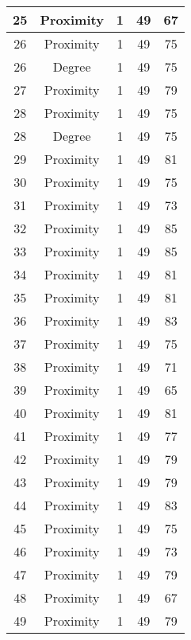 \documentclass[results.tex]{subfiles}
\begin{document}
\begin{center}
\begin{tabular}{| c || c | c | c | c |}
    \hline
    25 & Proximity & 1 & 49 & 67 \\ 
    \hline
    26 & Proximity & 1 & 49 & 75 \\ 
    \hline
    26 & Degree & 1 & 49 & 75 \\ 
    \hline
    27 & Proximity & 1 & 49 & 79 \\ 
    \hline
    28 & Proximity & 1 & 49 & 75 \\ 
    \hline
    28 & Degree & 1 & 49 & 75 \\ 
    \hline
    29 & Proximity & 1 & 49 & 81 \\ 
    \hline
    30 & Proximity & 1 & 49 & 75 \\ 
    \hline
    31 & Proximity & 1 & 49 & 73 \\ 
    \hline
    32 & Proximity & 1 & 49 & 85 \\ 
    \hline
    33 & Proximity & 1 & 49 & 85 \\ 
    \hline
    34 & Proximity & 1 & 49 & 81 \\ 
    \hline
    35 & Proximity & 1 & 49 & 81 \\ 
    \hline
    36 & Proximity & 1 & 49 & 83 \\ 
    \hline
    37 & Proximity & 1 & 49 & 75 \\ 
    \hline
    38 & Proximity & 1 & 49 & 71 \\ 
    \hline
    39 & Proximity & 1 & 49 & 65 \\ 
    \hline
    40 & Proximity & 1 & 49 & 81 \\ 
    \hline
    41 & Proximity & 1 & 49 & 77 \\ 
    \hline
    42 & Proximity & 1 & 49 & 79 \\ 
    \hline
    43 & Proximity & 1 & 49 & 79 \\ 
    \hline
    44 & Proximity & 1 & 49 & 83 \\ 
    \hline
    45 & Proximity & 1 & 49 & 75 \\ 
    \hline
    46 & Proximity & 1 & 49 & 73 \\ 
    \hline
    47 & Proximity & 1 & 49 & 79 \\ 
    \hline
    48 & Proximity & 1 & 49 & 67 \\ 
    \hline
    49 & Proximity & 1 & 49 & 79 \\ 
    \hline   \end{tabular}
\end{center}
\end{document}
